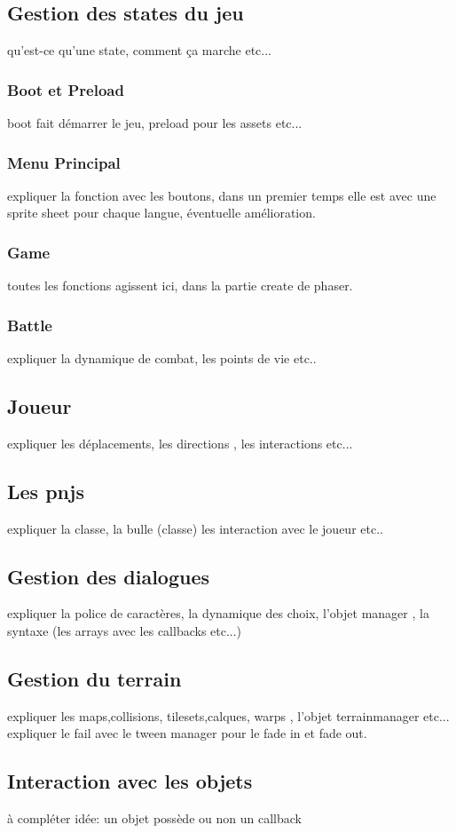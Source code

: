 \documentclass[11pt]{article}
\begin{document}
\subsection{Gestion des states du jeu}
qu'est-ce qu'une state, comment ça marche etc...
\subsubsection{Boot et Preload}
boot fait démarrer le jeu, preload pour les assets etc...
\subsubsection{Menu Principal}
expliquer la fonction avec les boutons, dans un premier temps elle est avec une sprite sheet pour chaque langue, éventuelle amélioration.

\subsubsection{Game}
toutes les fonctions agissent ici, dans la partie create de phaser.
\subsubsection{Battle}
expliquer la dynamique de combat, les points de vie etc..
\subsection{Joueur}
expliquer les déplacements, les directions , les interactions etc...
\subsection{Les pnjs}
expliquer la classe, la bulle (classe) 
les interaction avec le joueur etc..
\subsection{Gestion des dialogues}
expliquer la police de caractères, la dynamique des choix, l'objet manager , la syntaxe (les arrays avec les callbacks etc...)
\subsection{Gestion du terrain}
expliquer les maps,collisions, tilesets,calques, warps , l'objet terrainmanager etc... expliquer le fail avec le tween manager pour le fade in et fade out.
\subsection{Interaction avec les objets}
à compléter idée: un objet possède ou non un callback 
\end{document}
